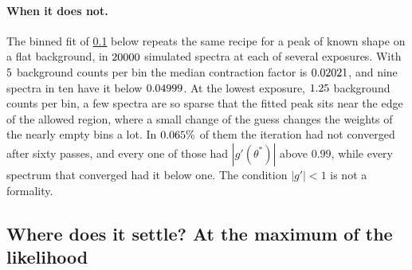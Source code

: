 \paragraph{When it does not.}
The binned fit of \cref{T5b:sec:fixed-ml} below repeats the same recipe for a
peak of known shape on a flat background, in $20000$ simulated
spectra at each of several exposures. With $5$ background
counts per bin the median contraction factor is $0.02021$, and nine
spectra in ten have it below $0.04999$. At the lowest exposure,
$1.25$ background counts per bin, a few spectra are so sparse
that the fitted peak sits near the edge of the allowed region, where a
small change of the guess changes the weights of the nearly empty bins a
lot. In $0.065\%$ of them the iteration had not converged
after sixty passes, and every one of those had $|g'(\theta^*)|$ above $0.99$,
while every spectrum that converged had it below one. The condition
$|g'|<1$ is not a formality.

\subsection{Where does it settle? At the maximum of the likelihood}
\label{T5b:sec:fixed-ml}

